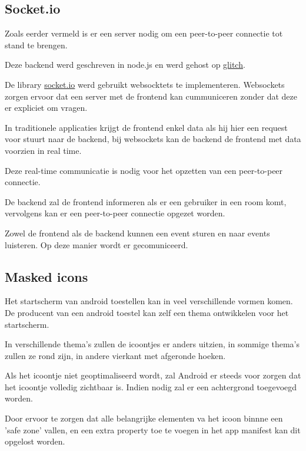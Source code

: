 	\subsection{Socket.io}
	
		Zoals eerder vermeld is er een server nodig om een peer-to-peer connectie tot stand te brengen.
		
		Deze backend werd geschreven in node.js en werd gehost op \href{https://glitch.com/}{glitch}.
		
		De library \href{https://socket.io/}{socket.io} werd gebruikt websocktets te implementeren. Websockets zorgen ervoor dat een server met de frontend kan cummuniceren zonder dat deze er expliciet om vragen. 
		
		In traditionele applicaties krijgt de frontend enkel data als hij hier een request voor stuurt naar de backend, bij websockets kan de backend de frontend met data voorzien in real time.
		\autocite{Mozilla2020e}
		
		Deze real-time communicatie is nodig voor het opzetten van een peer-to-peer connectie.
		
		De backend zal de frontend informeren als er een gebruiker in een room komt, vervolgens kan er een peer-to-peer connectie opgezet worden.
		
		Zowel de frontend als de backend kunnen een event sturen en naar events luisteren. Op deze manier wordt er gecomuniceerd. 	
		
			
	\subsection{Masked icons}
	
		Het startscherm van android toestellen kan in veel verschillende vormen komen. De producent van een android toestel kan zelf een thema ontwikkelen voor het startscherm.
		
		In verschillende thema's zullen de icoontjes er anders uitzien, in sommige thema's zullen ze rond zijn, in andere vierkant met afgeronde hoeken. 
		
		Als het icoontje niet geoptimaliseerd wordt, zal Android er steeds voor zorgen dat het icoontje volledig zichtbaar is. Indien nodig zal er een achtergrond toegevoegd worden.
		
	
		
		Door ervoor te zorgen dat alle belangrijke elementen va het icoon binnne een 'safe zone' vallen, en een extra property toe te voegen in het app manifest kan dit opgelost worden.
		

